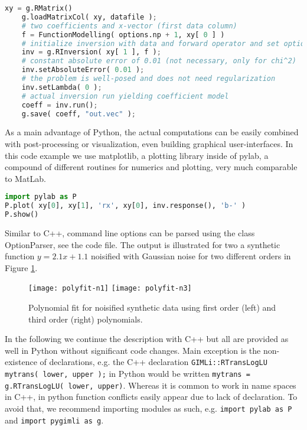\begin{lstlisting}[language=python]
    xy = g.RMatrix()
    g.loadMatrixCol( xy, datafile );
    # two coefficients and x-vector (first data column)
    f = FunctionModelling( options.np + 1, xy[ 0 ] )
    # initialize inversion with data and forward operator and set options
    inv = g.RInversion( xy[ 1 ], f );
    # constant absolute error of 0.01 (not necessary, only for chi^2)
    inv.setAbsoluteError( 0.01 );
    # the problem is well-posed and does not need regularization
    inv.setLambda( 0 );
    # actual inversion run yielding coefficient model
    coeff = inv.run();
    g.save( coeff, "out.vec" );
\end{lstlisting}

As a main advantage of Python, the actual computations can be easily combined with post-processing or visualization, even building graphical user-interfaces. 
In this code example we use matplotlib, a plotting library inside of pylab, a compound of different routines for numerics and plotting, very much comparable to MatLab.

\begin{lstlisting}[language=python]
import pylab as P
P.plot( xy[0], xy[1], 'rx', xy[0], inv.response(), 'b-' )
P.show()
\end{lstlisting}

Similar to C++, command line options can be parsed using the class OptionParser, see the code file.
The output is illustrated for two a synthetic function $y=2.1x+1.1$ noisified with Gaussian noise for two different orders in Figure \ref{fig:polyfit}.

\begin{figure}[hbt]%
\texttt{[image: polyfit-n1]}\hfill
\texttt{[image: polyfit-n3]}%
\caption{Polynomial fit for noisified synthetic data using first order (left) and third order (right) polynomials.}%
\label{fig:polyfit}%
\end{figure}

In the following we continue the description with C++ but all are provided as well in Python without significant code changes.
Main exception is the non-existence of declarations, e.g. the C++ declaration \lstinline|GIMLi::RTransLogLU mytrans( lower, upper );| in Python would be written \lstinline|mytrans = g.RTransLogLU( lower, upper)|.
Whereas it is common to work in name spaces in C++, in python function conflicts easily appear due to lack of declaration.
To avoid that, we recommend importing modules as such, e.g. \lstinline|import pylab as P| and \lstinline|import pygimli as g|.

